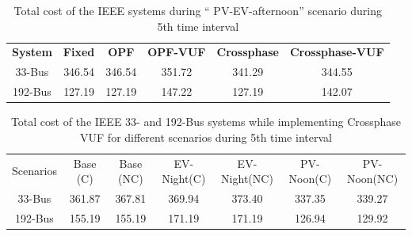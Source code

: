\documentclass[journal]{IEEEtran}
\begin{document}
\begin{center}
\begin{table}
\caption{Total cost of the IEEE systems during “ PV-EV-afternoon” scenario during 5th time interval}
\label{Table9}
\centering

\begin{tabular}{c|c|c|c|c|c}
    \hline\hline
    \multirow{2}[0]{2em}{\textbf{System}} &  \multirow{2}[0]{2em}{\textbf{Fixed}} & \multirow{2}[0]{2em}{\textbf{OPF}} & \multirow{2}[0]{2.5em}{\textbf{OPF-VUF}} & \multirow{2}[0]{5em}{\textbf{Crossphase}} & \multirow{2}[0]{5em}{\textbf{Crossphase-VUF}} \\ & & & & & \\ \hline
    33-Bus & 346.54 & 346.54 & 351.72 & 341.29 & 344.55\\ 
    \hline
    192-Bus & 127.19 & 127.19 & 147.22 & 127.19 & 142.07\\ 
    \hline\hline
    \end{tabular}

\end{table}
\end{center}

\begin{center}
\begin{table}
\caption{Total cost of the IEEE 33- and 192-Bus systems while implementing Crossphase VUF for different scenarios during 5th time interval}
\label{VUFstandar}
\centering
\setlength{\tabcolsep}{3.5pt}
\begin{tabular}{c|c|c|c|c|c|c}
\hline\hline
 \multirow{2}{3.5em}{Scenarios} &
\multirow{2}{2.8em}{Base (C)} & \multirow{2}{3em}{Base (NC)} & \multirow{2}{3.8em}{EV-Night(C)} & \multirow{2}{3.9em}{EV-Night(NC)} & \multirow{2}{3.9em}{PV-Noon(C)} & \multirow{2}{3.9em}{PV-Noon(NC)}\\
 & & & & & &\\
\hline
\multirow{2}{*}{33-Bus}&
\multirow{2}{*}{361.87} & \multirow{2}{*}{367.81} & \multirow{2}{*}{369.94} & \multirow{2}{*}{373.40} & \multirow{2}{*}{337.35} & \multirow{2}{*}{339.27}\\
 & & & & & & \\ 
\hline
\multirow{2}{*}{192-Bus}&
\multirow{2}{*}{155.19} & \multirow{2}{*}{155.19} & \multirow{2}{*}{171.19}  & \multirow{2}{*}{171.19} & \multirow{2}{*}{126.94} & \multirow{2}{*}{129.92}\\
 & & & & & &\\ 
\hline\hline
    \end{tabular}

\end{table}
\end{center}
\end{document}
